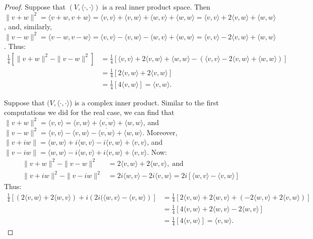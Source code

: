 \documentclass[9pt,reqno]{amsart}
\theoremstyle{definition}
\begin{document}
\begin{proof}
	Suppose that $(V, \langle \cdot, \cdot \rangle)$ is a real inner product space. Then $\| v+w \|^2 = \langle v+w, v+w \rangle = \langle v,v \rangle + \langle v,w \rangle + \langle w, v \rangle + \langle w, w \rangle = \langle v,v \rangle + 2 \langle v,w \rangle  + \langle w, w \rangle$, and, similarly, $\| v-w\|^2 = \langle v-w, v-w \rangle= \langle v,v \rangle -\langle v,w \rangle - \langle w, v \rangle + \langle w, w \rangle = \langle v,v \rangle - 2\langle v,w \rangle + \langle w, w \rangle$. Thus: 
\begin{align*}
	\frac{1}{4} \left [ \| v+w \|^2 - \|v - w \|^2 \right ] &= \frac{1}{4} \left[ \langle v,v \rangle + 2 \langle v,w \rangle  + \langle w, w \rangle - (\langle v,v \rangle - 2\langle v,w \rangle + \langle w, w \rangle ) \right] \\ 
	&= \frac{1}{4} \left[ 2\langle v, w \rangle + 2 \langle v, w \rangle \right]\\
	&= \frac{1}{4} \left[4 \langle v, w \rangle \right] = \langle v,w \rangle.
\end{align*}

Suppose that $(V, \langle \cdot, \cdot \rangle$) is a complex inner product. Similar to the first computations we did for the real case, we can find that $\|v+w\|^2 = \langle v, v \rangle = \langle v, w \rangle  + \overline{\langle v, w \rangle } + \langle w, w \rangle $, and $\|v -w \|^2 = \langle v,v \rangle - \langle v,w \rangle - \overline{\langle v, w \rangle }+ \langle w, w \rangle $. Moreover, $\|v+iw\| = \langle w, w \rangle + i \langle w, v \rangle -i\langle v, w\rangle + \langle v, v \rangle $, and $\|v-iw \|= \langle w,w \rangle -i \langle w, v \rangle + i \langle v, w \rangle + \langle v, v \rangle $. Now:
\begin{align*}
	\|v+w \|^2-\|v-w\|^2 &= 2 \langle v,w \rangle +2 \langle w,v \rangle, \; \text{and} \\
	\|v+iw\|^2-\|v-iw\|^2 &= 2i \langle w,v \rangle -2i \langle v,w \rangle = 2i \left [ \langle w,v \rangle - \langle v, w \rangle \right] 
\end{align*}
Thus: 
\begin{align*}
	\frac{1}{4} \left [ \left ( 2 \langle v,w \rangle +2 \langle w,v \rangle \right ) + i \left (2i (\langle w,v \rangle - \langle v, w \rangle \right) \right ] &= \frac{1}{4} \left [ 2 \langle v,w \rangle +2 \langle w,v \rangle +  (-2 \langle w,v \rangle +2 \langle v, w \rangle ) \right ]\\
	&= \frac{1}{4}\left[ 4 \langle v,w \rangle + 2 \langle w, v \rangle -2\langle w , v\rangle \right]\\
	&= \frac{1}{4} \left[4 \langle v, w \rangle \right] = \langle v, w \rangle.
	\end{align*}
\end{proof}
\end{document}
